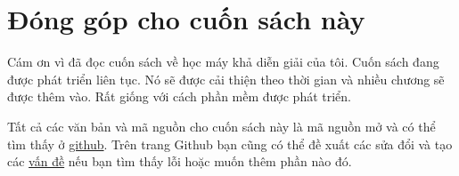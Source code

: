 \chapter{Đóng góp cho cuốn sách này}

Cám ơn vì đã đọc cuốn sách về học máy khả diễn giải của tôi. Cuốn sách đang được phát triển liên tục. Nó sẽ được cải thiện theo thời gian và nhiều chương sẽ được thêm vào. Rất giống với cách phần mềm được phát triển.

Tất cả các văn bản và mã nguồn cho cuốn sách này là mã nguồn mở và có thể tìm thấy ở \href{https://github.com/christophM/interpretable-ml-book}{github}. Trên trang Github bạn cũng có thể đề xuất các sửa đổi và tạo các \href{https://github.com/christophM/interpretable-ml-book/issues}{vấn đề} nếu bạn tìm thấy lỗi hoặc muốn thêm phần nào đó.
\clearpage